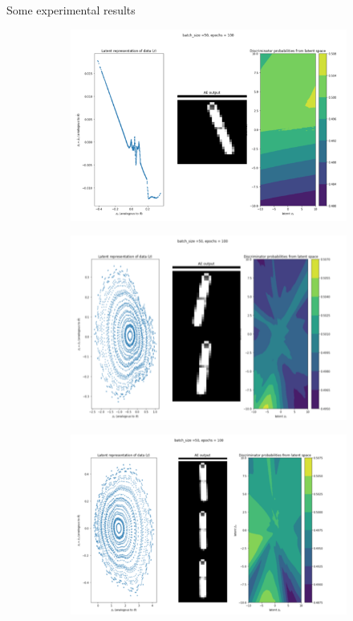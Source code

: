 \documentclass{article}
\begin{document}
Some experimental results
\begin{figure}[h!]
\centering
\begin{subfigure}{0.7\textwidth}
\includegraphics[width=\textwidth]{figures/gan_phase_1stack.png}
\end{subfigure}
\begin{subfigure}{0.7\textwidth}
\includegraphics[width=\textwidth]{figures/gan_phase_2stack.png}
\end{subfigure}
\begin{subfigure}{0.7\textwidth}
\includegraphics[width=\textwidth]{figures/gan_phase_3stack.png}
\end{subfigure}
\end{figure}
\end{document}
